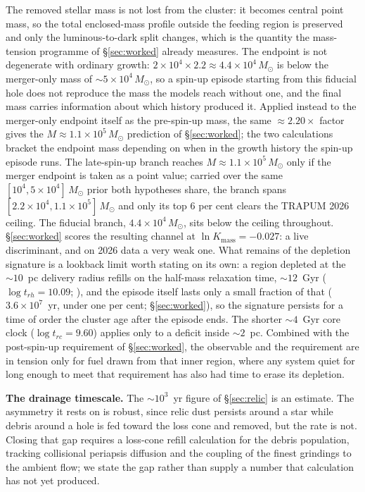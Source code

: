\documentclass[11pt]{article}
\newcommand{\msun}{\ensuremath{M_\odot}}
\newcommand{\lnK}{\ensuremath{\ln K}}
\begin{document}
The removed stellar mass is not lost from the cluster: it becomes central point mass, so the total enclosed-mass profile outside the feeding region is preserved and only the luminous-to-dark split changes, which is the quantity the mass-tension programme of \S\ref{sec:worked} already measures. The endpoint is not degenerate with ordinary growth: $2\times10^{4} \times 2.2 \approx 4.4\times10^{4}\,\msun$ is below the \citet{GonzalezPrieto2025} merger-only mass of $\sim 5\times10^{4}\,\msun$, so a spin-up episode starting from this fiducial hole does not reproduce the mass the models reach without one, and the final mass carries information about which history produced it. Applied instead to the merger-only endpoint itself as the pre-spin-up mass, the same $\approx 2.20\times$ factor gives the $M \approx 1.1\times10^{5}\,\msun$ prediction of \S\ref{sec:worked}; the two calculations bracket the endpoint mass depending on when in the growth history the spin-up episode runs. The late-spin-up branch reaches $M \approx 1.1\times10^{5}\,\msun$ only if the merger endpoint is taken as a point value; carried over the same $[10^{4}, 5\times10^{4}]\,\msun$ prior both hypotheses share, the branch spans $[2.2\times10^{4}, 1.1\times10^{5}]\,\msun$ and only its top $6$ per cent clears the TRAPUM 2026 ceiling. The fiducial branch, $4.4\times10^{4}\,\msun$, sits below the ceiling throughout. \S\ref{sec:worked} scores the resulting channel at $\lnK_{\mathrm{mass}} = -0.027$: a live discriminant, and on 2026 data a very weak one. What remains of the depletion signature is a lookback limit worth stating on its own: a region depleted at the $\sim 10$~pc delivery radius refills on the half-mass relaxation time, $\sim 12$~Gyr ($\log t_{rh} = 10.09$; \citealt{Harris1996}), and the episode itself lasts only a small fraction of that ($3.6\times10^{7}$~yr, under one per cent; \S\ref{sec:worked}), so the signature persists for a time of order the cluster age after the episode ends. The shorter $\sim 4$~Gyr core clock ($\log t_{rc} = 9.60$) applies only to a deficit inside $\sim 2$~pc. Combined with the post-spin-up requirement of \S\ref{sec:worked}, the observable and the requirement are in tension only for fuel drawn from that inner region, where any system quiet for long enough to meet that requirement has also had time to erase its depletion.

\textbf{The drainage timescale.} The $\sim 10^{3}$~yr figure of \S\ref{sec:relic} is an estimate. The asymmetry it rests on is robust, since relic dust persists around a star while debris around a hole is fed toward the loss cone and removed, but the rate is not. Closing that gap requires a loss-cone refill calculation for the debris population, tracking collisional periapsis diffusion and the coupling of the finest grindings to the ambient flow; we state the gap rather than supply a number that calculation has not yet produced.
\end{document}
